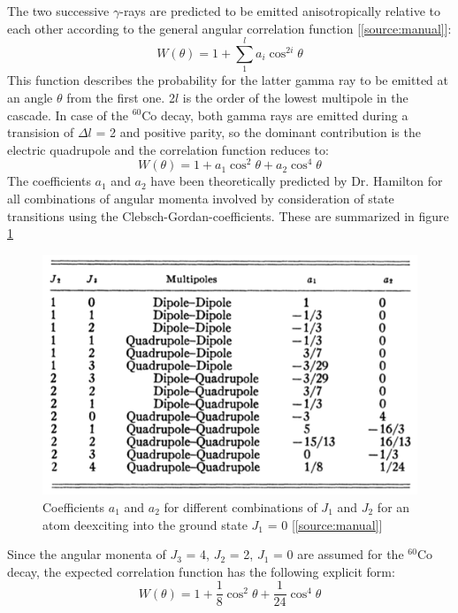 \documentclass[a4paper,parskip,11pt, DIV12]{scrreprt}
\begin{document}
		The two successive $\gamma$-rays are predicted to be emitted anisotropically relative to each other according to the general angular correlation function [\ref{source:manual}]:
		\begin{equation}
		W(\theta) = 1 + \sum^l_1 a_i \cos ^{2i} \theta
		\end{equation}	
		This function describes the probability for the latter gamma ray to be emitted at an angle $\theta$ from the first one. 2$l$ is the order of the lowest multipole in the cascade. In case of the $^{60}$Co decay, both gamma rays are emitted during a transision of $\Delta l$ = 2 and positive parity, so the dominant contribution is the electric quadrupole and the correlation function reduces to:	
		\begin{equation}
		W(\theta) = 1 + a_1 \cos ^{2} \theta +  a_2 \cos ^{4} \theta
		\end{equation}		
		The coefficients $a_1$ and $a_2$ have been theoretically predicted by Dr. Hamilton for all combinations of angular momenta involved by consideration of state transitions using the Clebsch-Gordan-coefficients. These are summarized in figure \ref{fig:coefficients}		
		\begin{figure}[H]
\centering
\includegraphics[scale=0.4]{Coefficients.png}
\caption[Coefficients]{Coefficients $a_1$ and $a_2$ for different combinations of $J_1$ and $J_2$ for an atom deexciting into the ground state $J_1$ = 0 [\ref{source:manual}]}
\label{fig:coefficients}
		\end{figure}		
		Since the angular monenta of $J_3$ = 4, $J_2$ = 2, $J_1$ = 0 are assumed for the $^{60}$Co decay, the expected correlation function has the following explicit form:		
		\begin{equation} \label{eq:AngularCorrelation}
		W(\theta) = 1 + \frac{1}{8} \cos ^{2} \theta +  \frac{1}{24} \cos ^{4} \theta
		\end{equation} 
		
\end{document}
